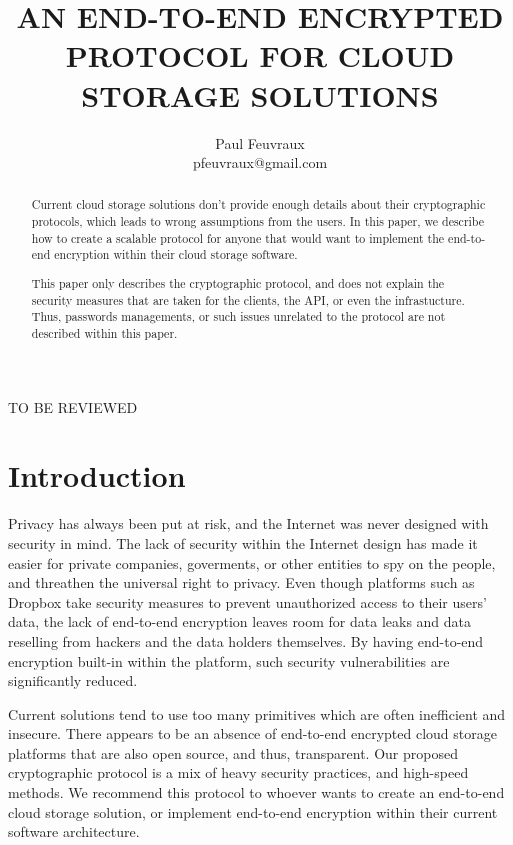 \documentclass[a4paper,9pt,twoside]{article}
\title{AN END-TO-END ENCRYPTED PROTOCOL FOR CLOUD STORAGE SOLUTIONS}
\author{Paul Feuvraux \\ pfeuvraux@gmail.com}
\begin{document}
\maketitle

\thispagestyle{empty}

TO BE REVIEWED


\begin{abstract}

Current cloud storage solutions don't provide enough details 
about their cryptographic protocols, which leads to wrong assumptions from the users. 
In this paper, we describe how to create a scalable protocol for anyone that would want to 
implement the end-to-end encryption within their cloud storage 
software.

    This paper only describes the cryptographic protocol, 
and does not explain the security measures that are taken for the 
clients, the API, or even the infrastucture. Thus, passwords 
managements, or such issues unrelated to the protocol are not 
described within this paper.
\end{abstract}


\section{Introduction}
Privacy has always been put at risk, and the Internet was never designed with security in mind. 
The lack of security within the Internet design has made it easier for private companies, goverments, or other 
entities to spy on the people, and threathen the universal right to privacy. 
Even though platforms such as  Dropbox take security measures to prevent unauthorized access to their users' data, 
the lack of end-to-end encryption leaves room for data leaks and data reselling from hackers and the data holders themselves. 
By having end-to-end encryption built-in within the platform, such security vulnerabilities are significantly reduced.

    Current solutions tend to use too many primitives which are often inefficient and insecure. 
There appears to be an absence of end-to-end encrypted cloud storage platforms that are also open source, and thus, transparent. 
Our proposed cryptographic protocol is a mix of heavy security practices, and high-speed methods. We recommend this protocol 
to whoever wants to create an end-to-end cloud storage solution, or implement end-to-end encryption within their 
current software architecture.
\end{document}
